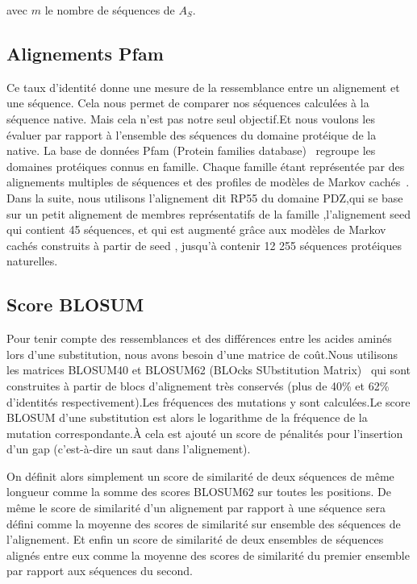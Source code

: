 \begin{enumerate}
avec $m$ le nombre de séquences de $A_S$.

\subsection{Alignements Pfam}
\label{subsection:Align_Pfam}
Ce taux d'identité donne une mesure de la ressemblance entre un alignement et une séquence. Cela nous permet de comparer nos séquences calculées à la séquence native. Mais cela n'est pas notre seul objectif.Et nous voulons les évaluer par rapport à l'ensemble des séquences du domaine protéique de la native.  
La base de données Pfam (Protein families database)~\citep{refPfam} regroupe les domaines protéiques connus en famille. Chaque famille étant représentée par des alignements multiples de séquences et des profiles de modèles de Markov cachés~\citep{refPfam}. Dans la suite, nous utilisons l'alignement dit \og RP55 \fg du domaine PDZ,qui se base sur un petit alignement de membres représentatifs de la famille ,l'alignement \og seed \fg qui contient 45 séquences, et qui est augmenté grâce  aux modèles de Markov cachés construits à partir de \og seed \fg , jusqu'à contenir 12 255 séquences protéiques naturelles.

\subsection{Score BLOSUM}

Pour tenir compte des ressemblances et des différences entre les acides aminés lors d'une substitution, nous avons besoin d'une matrice de coût.Nous utilisons les matrices BLOSUM40 et BLOSUM62 (BLOcks SUbstitution Matrix)~\citep{refBLOSUM} qui sont construites à partir de blocs d'alignement très conservés (plus de 40\% et 62\% d'identités respectivement).Les fréquences des mutations y sont calculées.Le score BLOSUM d'une substitution est alors le logarithme de la fréquence de la mutation correspondante.À cela est ajouté un score de pénalités pour l'insertion d'un gap (c'est-à-dire un saut dans l'alignement).

On définit alors simplement un score de similarité de deux séquences de même longueur comme la somme des scores BLOSUM62 sur toutes les positions. De même le score de similarité d'un alignement par rapport à une séquence sera défini comme la moyenne des scores de similarité sur ensemble des séquences de l'alignement. Et enfin un score de similarité de deux ensembles de séquences alignés entre eux comme la moyenne des scores de similarité du premier ensemble par rapport aux séquences du second.  


\end{enumerate}
